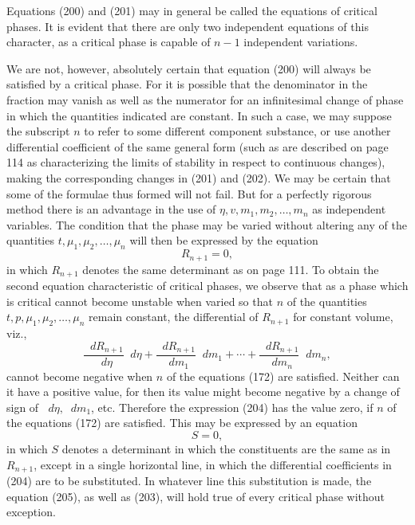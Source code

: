 \documentclass[11pt]{article}
\newcommand{\dd}{\mathop{}\!d}
\begin{document}
Equations (200) and (201) may in general be called the equations of critical phases. It is evident that there are only two independent equations of this character, as a critical phase is capable of $n-1$ independent variations.

We are not, however, absolutely certain that equation (200) will always be satisfied by a critical phase. For it is possible that the denominator in the fraction may vanish as well as the numerator for an infinitesimal change of phase in which the quantities indicated are constant. In such a case, we may suppose the subscript $n$ to refer to some different component substance, or use another differential coefficient of the same general form (such as are described on page 114 as characterizing the limits of stability in respect to continuous changes), making the corresponding changes in (201) and (202). We may be certain that some of the formulae thus formed will not fail. But for a perfectly rigorous method there is an advantage in the use of $\eta,v,m_1,m_2,\ldots,m_n$ as independent variables. The condition that the phase may be varied without altering any of the quantities $t,\mu_1,\mu_2,\ldots,\mu_n$ will then be expressed by the equation
\begin{equation}\label{eq:gibbs-v1-p3-203}
R_{n+1}=0,
\tag{203}
\end{equation}
in which $R_{n+1}$ denotes the same determinant as on page 111. To obtain the second equation characteristic of critical phases, we observe that as a phase which is critical cannot become unstable when varied so that $n$ of the quantities $t,p,\mu_1,\mu_2,\ldots,\mu_n$ remain constant, the differential of $R_{n+1}$ for constant volume, viz.,
\begin{equation}\label{eq:gibbs-v1-p3-204}
\frac{\dd R_{n+1}}{\dd\eta}\dd\eta
+\frac{\dd R_{n+1}}{\dd m_1}\dd m_1
+\cdots+
\frac{\dd R_{n+1}}{\dd m_n}\dd m_n,
\tag{204}
\end{equation}
cannot become negative when $n$ of the equations (172) are satisfied. Neither can it have a positive value, for then its value might become negative by a change of sign of $\dd\eta,\dd m_1$, etc. Therefore the expression (204) has the value zero, if $n$ of the equations (172) are satisfied. This may be expressed by an equation
\begin{equation}\label{eq:gibbs-v1-p3-205}
S=0,
\tag{205}
\end{equation}
in which $S$ denotes a determinant in which the constituents are the same as in $R_{n+1}$, except in a single horizontal line, in which the differential coefficients in (204) are to be substituted. In whatever line this substitution is made, the equation (205), as well as (203), will hold true of every critical phase without exception.
\end{document}

